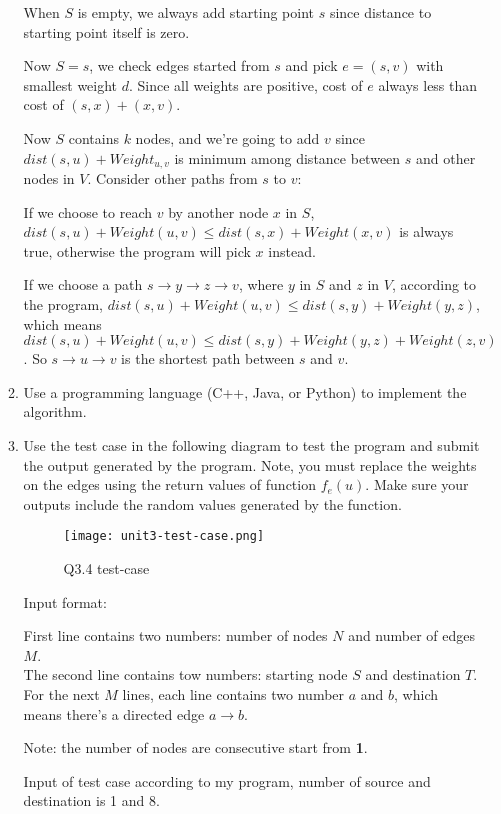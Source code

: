 \documentclass[14pt, a4paper]{article}
\begin{document}
\begin{enumerate}
\begin{enumerate}[label*=\arabic*]
When $S$ is empty, we always add starting point $s$ since distance to starting point itself is zero.

Now $S = {s}$, we check edges started from $s$ and pick $e = (s, v)$ with smallest weight $d$. Since all 
weights are positive, cost of $e$ always less than cost of $(s, x) + (x, v)$.

Now $S$ contains $k$ nodes, and we're going to add $v$ since $dist(s, u) + Weight_{u, v}$ is minimum among 
distance between $s$ and other nodes in $V$. Consider other paths from $s$ to $v$:

If we choose to reach $v$ by another node $x$ in $S$, $dist(s, u) + Weight(u, v) \le dist(s, x) + Weight(x, v)$ 
is always true, otherwise the program will pick $x$ instead.

If we choose a path $s \to y \to z \to v$, where $y$ in $S$ and $z$ in $V$, according to the program,  
$dist(s, u) + Weight(u, v) \le dist(s, y) + Weight(y, z)$, which means 
$dist(s, u) + Weight(u, v) \le dist(s, y) + Weight(y, z) + Weight(z, v)$. 
So $s \to u \to v$ is the shortest path between $s$ and $v$.

\item Use a programming language (C++, Java, or Python) to implement the algorithm. 

\item Use the test case in the following diagram to test the program and submit the output generated by the program. Note, you must replace the weights on the edges using the return values of function $f_e(u)$. Make sure your outputs include the random values generated by the function.

\begin{figure}[h!]
\centering
\texttt{[image: unit3-test-case.png]}
\caption{Q3.4 test-case}
\end{figure}

Input format: 

First line contains two numbers: number of nodes $N$ and number of edges $M$.\\
The second line contains tow numbers: starting node $S$ and destination $T$.\\
For the next $M$ lines, each line contains two number $a$ and $b$, which means there's a directed edge $a \to b$.

Note: the number of nodes are consecutive start from \textbf{1}.

Input of test case according to my program, number of source and destination is 1 and 8.


\end{enumerate}
\end{enumerate}
\end{document}
